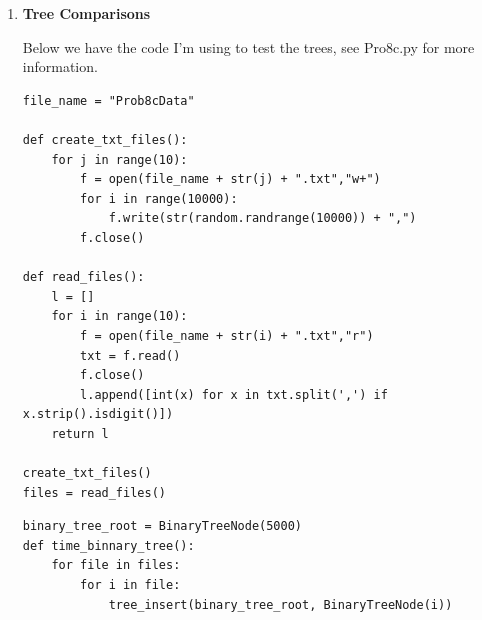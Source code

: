 \documentclass{article}
\begin{document}
\begin{enumerate}
\begin{enumerate}
\begin{lstlisting}
    def print_tree(self):
        out = self.root.print_node()
        out += '\n'.join([child.print_node() for child in self.root.c])
        return out      
    \end{lstlisting}

    \begin{lstlisting}
A = [15, 68, 25, 8, 41, 23, 96, 3, 89, 53, 31, 92, 83, 30, 16, 51, 76, 88, 70, 90]
root = BTree()
root.b_tree_create(5)


T = root
for a in A:
    T.b_tree_insert(a)

print(root.print_tree())
    
T.b_tree_delete(5)

print(root.print_tree())

# Output:
# Node: [25, 68]
# Children: ['Leaf node:[3, 8, 15, 16, 23]', 'Leaf node:[30, 31, 41, 51, 53]', 'Leaf node:[70, 76, 83, 88, 89, 90, 92, 96]']
# Leaf node:[3, 8, 15, 16, 23]
# Leaf node:[30, 31, 41, 51, 53]
# Leaf node:[70, 76, 83, 88, 89, 90, 92, 96]
#
# Delete(15)
# Node: [25, 68]
# Children: ['Leaf node:[3, 8, 15, 16, 23]', 'Leaf node:[30, 31, 41, 51, 53]', 'Leaf node:[70, 76, 83, 88, 89, 90, 92, 96]']
# Leaf node:[3, 8, 16, 23]
# Leaf node:[30, 31, 41, 51, 53]
# Leaf node:[70, 76, 83, 88, 89, 90, 92, 96]
    \end{lstlisting}

    \item \textbf{Tree Comparisons}
    
    Below we have the code I'm using to test the trees, see Pro8c.py for more information.

    \begin{lstlisting}
file_name = "Prob8cData"

def create_txt_files():
    for j in range(10):
        f = open(file_name + str(j) + ".txt","w+")
        for i in range(10000):
            f.write(str(random.randrange(10000)) + ",")
        f.close()

def read_files():
    l = []
    for i in range(10):
        f = open(file_name + str(i) + ".txt","r")
        txt = f.read()
        f.close()
        l.append([int(x) for x in txt.split(',') if x.strip().isdigit()])
    return l

create_txt_files()
files = read_files()
    \end{lstlisting}

    \begin{lstlisting}
binary_tree_root = BinaryTreeNode(5000)
def time_binnary_tree():
    for file in files:
        for i in file:
            tree_insert(binary_tree_root, BinaryTreeNode(i)) 


\end{lstlisting}
\end{enumerate}
\end{enumerate}
\end{document}
